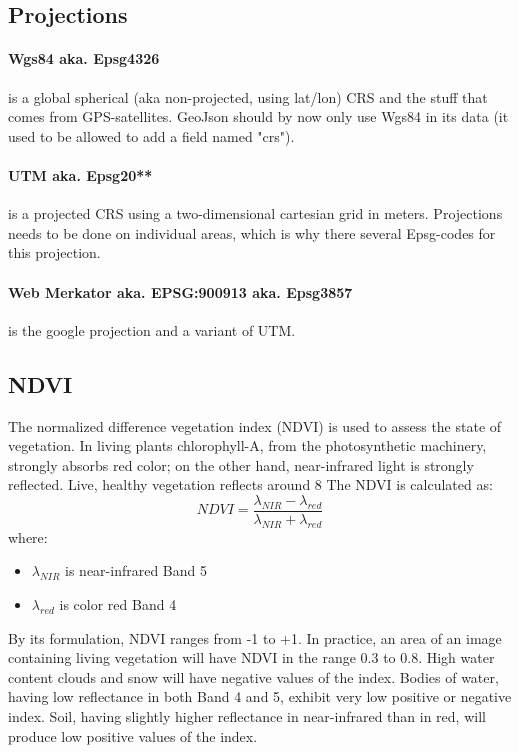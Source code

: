 \subsection{Projections}

\paragraph{Wgs84 aka. Epsg4326} is a global spherical (aka non-projected, using lat/lon) CRS and the stuff that comes from GPS-satellites. GeoJson should by now only  use Wgs84 in its data (it used to be allowed to add a field named "crs"). 
\paragraph{UTM aka. Epsg20**} is a projected CRS using a  two-dimensional cartesian grid in meters. Projections needs to be done on individual areas, which is why there several Epsg-codes for this projection.
\paragraph{Web Merkator aka. EPSG:900913 aka. Epsg3857} is the google projection and a variant of UTM.

\subsection{NDVI}
The normalized difference vegetation index (NDVI) is used to assess the state of vegetation. In living plants chlorophyll-A, from the photosynthetic machinery, strongly absorbs red color; on the other hand, near-infrared light is strongly reflected. Live, healthy vegetation reflects around 8%
The NDVI is calculated as:
$$ NDVI = \frac{\lambda_{NIR} - \lambda_{red}}{\lambda_{NIR} + \lambda_{red}} $$
where:
\begin{itemize}
    \item $\lambda_{NIR}$ is near-infrared Band 5
    \item $\lambda_{red}$ is color red Band 4
\end{itemize}
By its formulation, NDVI ranges from -1 to +1. In practice, an area of an image containing living vegetation will have NDVI in the range 0.3 to 0.8. High water content clouds and snow will have negative values of the index. Bodies of water, having low reflectance in both Band 4 and 5, exhibit very low positive or negative index. Soil, having slightly higher reflectance in near-infrared than in red, will produce low positive values of the index.

